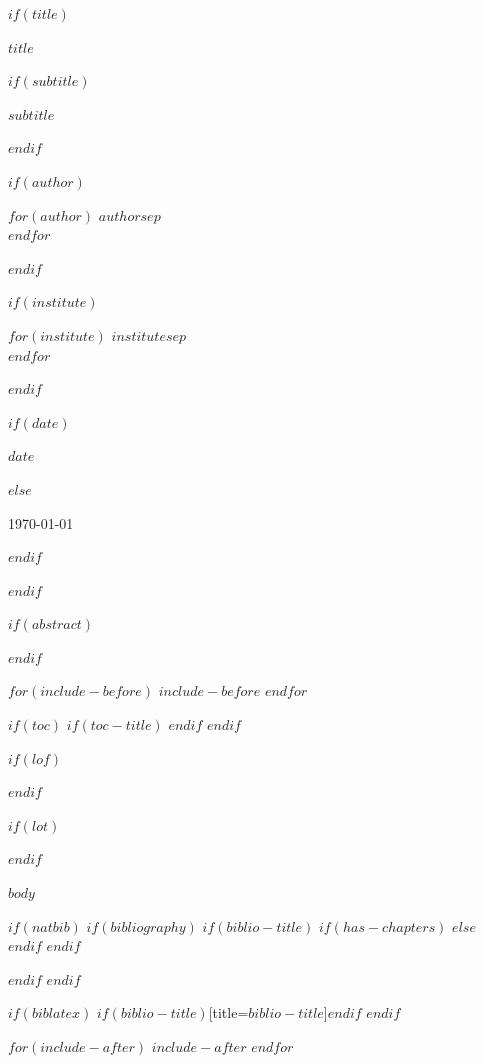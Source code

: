 \documentclass[$if(fontsize)$$fontsize$,$endif$$if(lang)$$babel-lang$,$endif$$if(papersize)$$papersize$paper,$endif$$for(classoption)$$classoption$$sep$,$endfor$]{$documentclass$}
\theoremstyle{definition}
\theoremstyle{plain}
\theoremstyle{remark}
\begin{document}
$if(title)$
\begin{titlepage}
\centering

\vspace*{2cm}

{\huge\bfseries $title$ \par}

$if(subtitle)$
\vspace{0.5cm}
{\Large $subtitle$ \par}
$endif$

\vspace{1.5cm}

$if(author)$
{\large
$for(author)$
$author$$sep$ \\
$endfor$
\par}
$endif$

$if(institute)$
\vspace{0.5cm}
{\normalsize
$for(institute)$
$institute$$sep$ \\
$endfor$
\par}
$endif$

\vfill

$if(date)$
{\large $date$ \par}
$else$
{\large \today \par}
$endif$

\end{titlepage}
$endif$

$if(abstract)$
\begin{abstract}
$abstract$
\end{abstract}
\thispagestyle{plain}
\clearpage
$endif$

$for(include-before)$
$include-before$
$endfor$

$if(toc)$
$if(toc-title)$
\renewcommand*\contentsname{$toc-title$}
$endif$
\tableofcontents
\clearpage
$endif$

$if(lof)$
\listoffigures
\clearpage
$endif$

$if(lot)$
\listoftables
\clearpage
$endif$

$body$

$if(natbib)$
$if(bibliography)$
\clearpage
$if(biblio-title)$
$if(has-chapters)$
\renewcommand\bibname{$biblio-title$}
$else$
\renewcommand\refname{$biblio-title$}
$endif$
$endif$

$endif$
$endif$

$if(biblatex)$
\clearpage
\printbibliography$if(biblio-title)$[title=$biblio-title$]$endif$
$endif$

$for(include-after)$
$include-after$
$endfor$
\end{document}
